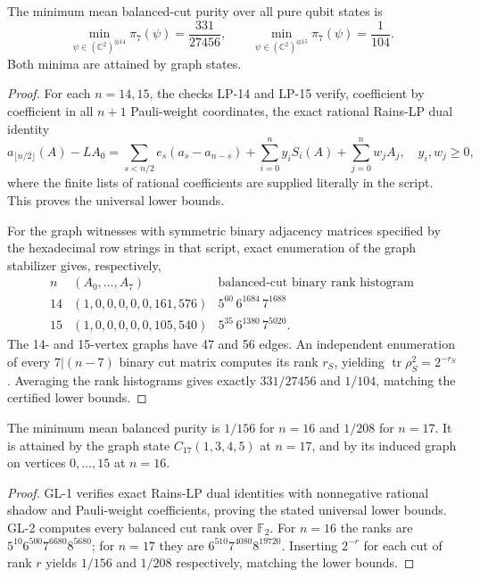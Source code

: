 \begin{theorem}
\label{thm:fourteenfifteen}
The minimum mean balanced-cut purity over all pure qubit states is
\[
 \min_{\psi\in(\mathbb C^2)^{\otimes14}}\pi_7(\psi)=\frac{331}{27456},
 \qquad
 \min_{\psi\in(\mathbb C^2)^{\otimes15}}\pi_7(\psi)=\frac1{104}.
\]
Both minima are attained by graph states.
\end{theorem}
\begin{proof}
For each $n=14,15$, the checks LP-14 and LP-15
verify, coefficient by
coefficient in all $n+1$ Pauli-weight coordinates, the exact rational
Rains-LP dual identity
\[
 a_{\lfloor n/2\rfloor}(A)-L A_0
  =\sum_{s< n/2}e_s(a_s-a_{n-s})
      +\sum_{i=0}^n y_i S_i(A)+\sum_{j=0}^n w_j A_j,
       \quad y_i,w_j\ge0,
\]
where the finite lists of rational coefficients are supplied literally
in the script. This proves the universal lower bounds.

For the graph witnesses with symmetric binary adjacency matrices
specified by the hexadecimal row strings in that script, exact
enumeration of the graph stabilizer gives, respectively,
\[
 \begin{array}{c|c|l}
 n & (A_0,\ldots,A_7) & \text{balanced-cut binary rank histogram}\\ \hline
 14 &(1,0,0,0,0,0,161,576)&5^{60}\,6^{1684}\,7^{1688}\\
 15 &(1,0,0,0,0,0,105,540)&5^{35}\,6^{1380}\,7^{5020}.
 \end{array}
\]
The 14- and 15-vertex graphs have 47 and 56 edges. An independent
enumeration of every $7|(n-7)$ binary cut matrix computes its rank
$r_S$, yielding $\operatorname{tr}\rho_S^2=2^{-r_S}$. Averaging the rank
histograms gives exactly $331/27456$ and $1/104$, matching the
certified lower bounds.
\end{proof}

\begin{theorem}
\label{thm:sixteenseventeen}
The minimum mean balanced purity is $1/156$ for $n=16$ and $1/208$
for $n=17$. It is attained by the graph state $C_{17}(1,3,4,5)$ at
$n=17$, and by its induced graph on vertices $0,\dots,15$ at $n=16$.
\end{theorem}
\begin{proof}
GL-1 verifies exact Rains-LP dual identities with nonnegative rational
shadow and Pauli-weight coefficients, proving the stated universal
lower bounds. GL-2 computes every balanced cut rank over $\mathbb F_2$.
For $n=16$ the ranks are $5^{10}6^{500}7^{6680}8^{5680}$;
for $n=17$ they are $6^{510}7^{4080}8^{19720}$.
Inserting $2^{-r}$ for each cut of rank $r$ yields $1/156$ and
$1/208$ respectively, matching the lower bounds.
\end{proof}
